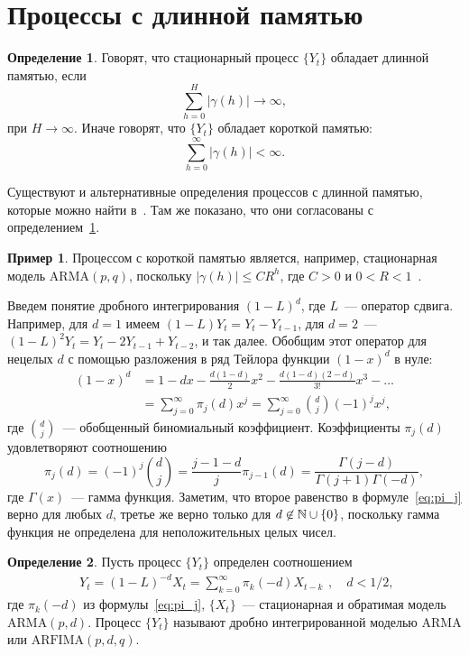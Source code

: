 \documentclass[specialist,
substylefile = spbu_report.rtx,
subf,href,colorlinks=true, 12pt]{disser}
\theoremstyle{definition}
\newtheorem{definition}{Определение}[chapter]
\newtheorem{example}{Пример}[chapter]
\begin{document}
\section{Процессы с длинной памятью}
\begin{definition}\label{def:longmemory}
	Говорят, что стационарный процесс $\{Y_t\}$ обладает длинной памятью, если
	\[
		\sum_{h=0}^H|\gamma(h)|\to\infty,
	\]
	при $H\to\infty$. Иначе говорят, что $\{Y_t\}$ обладает короткой памятью:
	\[
		\sum_{h=0}^\infty|\gamma(h)|<\infty.
	\]
\end{definition}
Существуют и альтернативные определения процессов с длинной памятью, которые можно найти в~\cite[Раздел 3.1]{Palma2006}. Там же показано, что они согласованы с определением~\ref{def:longmemory}.
\begin{example}
	Процессом с короткой памятью является, например, стационарная модель $\mathrm{ARMA}(p, q)$, поскольку $|\gamma(h)|\leqslant CR^h$, где $C>0$ и $0<R<1$~\cite[Section 10.4]{BoxJenkins2016}.
\end{example}
Введем понятие дробного интегрирования $(1-L)^d$, где $L$~--- оператор сдвига. Например, для $d=1$ имеем $(1-L)Y_t=Y_t-Y_{t-1}$, для $d=2$~--- $(1-L)^2Y_t=Y_t-2Y_{t-1}+Y_{t-2}$, и так далее. Обобщим этот оператор для нецелых $d$ с помощью разложения в ряд Тейлора функции $(1-x)^d$ в нуле:
\[
	\begin{aligned}
		(1-x)^d & =1-dx-\frac{d(1-d)}{2}x^2-\frac{d(1-d)(2-d)}{3!}x^3-\ldots             \\
		        & =\sum_{j=0}^\infty \pi_j(d)x^j=\sum_{j=0}^\infty\binom{d}{j}(-1)^jx^j,
	\end{aligned}
\]
где $\binom{d}{j}$~--- обобщенный биномиальный коэффициент. Коэффициенты $\pi_j(d)$ удовлетворяют соотношению
\begin{equation}\label{eq:pi_j}
	\pi_j(d)=(-1)^j\binom{d}{j}=\frac{j-1-d}{j}\pi_{j-1}(d)=\frac{\Gamma(j-d)}{\Gamma(j+1)\Gamma(-d)},
\end{equation}
где $\Gamma(x)$~--- гамма функция. Заметим, что второе равенство в формуле~\eqref{eq:pi_j} верно для любых $d$, третье же верно только для $d\not\in\mathbb{N}\cup\{0\}$, поскольку гамма функция не определена для неположительных целых чисел.
\begin{definition}\label{def:arfima}
	Пусть процесс $\{Y_t\}$ определен соотношением
	\[
		\begin{aligned}
			Y_t=(1-L)^{-d}X_t=\sum_{k=0}^\infty \pi_k(-d)X_{t-k}
		\end{aligned},\quad d<1/2,
	\]
	где $\pi_k(-d)$ из формулы~\eqref{eq:pi_j}, $\{X_t\}$~--- стационарная и обратимая модель $\mathrm{ARMA}(p, d)$. Процесс $\{Y_t\}$ называют дробно интегрированной моделью $\mathrm{ARMA}$ или $\mathrm{ARFIMA}(p, d, q)$.
\end{definition}
\end{document}
